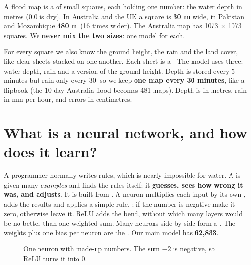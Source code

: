 A flood map is a  of small squares, each holding one number: the water depth in metres (0.0 is dry). In Australia and the UK a square is \textbf{30 m} wide, in Pakistan and Mozambique \textbf{480 m} (16 times wider). The Australia map has 1073 $\times$ 1073 squares. We \textbf{never mix the two sizes}: one model for each.

For every square we also know the ground height, the rain and the land cover, like clear sheets stacked on one another. Each sheet is a . The model uses three: water depth, rain and a version of the ground height. Depth is stored every 5 minutes but rain only every 30, so we keep \textbf{one map every 30 minutes}, like a flipbook (the 10-day Australia flood becomes 481 maps). Depth is in metres, rain in mm per hour, and errors in centimetres.

\section{What is a neural network, and how does it learn?}\label{ch:nn}

A programmer normally writes rules, which is nearly impossible for water. A  is given many \emph{examples} and finds the rules itself: it \textbf{guesses, sees how wrong it was, and adjusts}. It is built from . A neuron multiplies each input by its own , adds the results and applies a simple rule, : if the number is negative make it zero, otherwise leave it. ReLU adds the bend, without which many layers would be no better than one weighted sum. Many neurons side by side form a . The weights plus one bias per neuron are the . Our main model has \textbf{62,833}.

\begin{figure}[!htbp]
\centering
{}
\caption{One neuron with made-up numbers. The sum $-2$ is negative, so ReLU turns it into 0.}
\end{figure}

